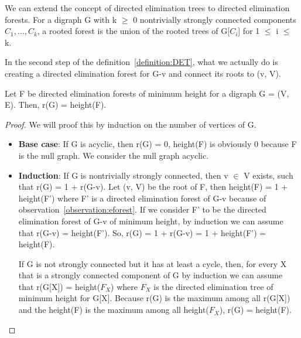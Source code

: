 We can extend the concept of directed elimination trees to directed elimination forests. For a digraph G with k $\geq$ 0 nontrivially strongly connected components $C_1, \ldots, C_k$, a rooted forest is the union of the rooted trees of G[$C_i$] for 1 $\leq$ i $\leq$ k.

\begin{observation}
In the second step of the definition~\ref{definition:DET}, what we actually do is creating a directed elimination forest for G-v and connect its roots to (v, V).
\label{observation:eforest}
\end{observation}

\begin{lemma}
Let F be directed elimination forests of minimum height for a digraph G = (V, E). Then, r(G) = height(F). 
\end{lemma}
\begin{proof}
We will proof this by induction on the number of vertices of G.
\begin{itemize}
  \item \textbf{Base case}: If G is acyclic, then r(G) = 0, height(F) is obviously 0 because F is the null graph. We consider the null graph acyclic.
  \item \textbf{Induction}: If G is nontrivially strongly connected, then v $\in$ V exists, such that r(G) = 1 + r(G-v). Let (v, V) be the root of F, then height(F) = 1 + height(F') where F' is a directed elimination forest of G-v because of observation~\ref{observation:eforest}. If we consider F' to be the directed elimination forest of G-v of minimum height, by induction we can assume that r(G-v) = height(F'). So, r(G) = 1 + r(G-v) = 1 + height(F') = height(F).
  
  If G is not strongly connected but it has at least a cycle, then, for every X that is a strongly connected component of G by induction we can assume that r(G[X]) = height($F_X$) where $F_X$ is the directed elimination tree of minimum height for G[X]. Because r(G) is the maximum among all r(G[X]) and the height(F) is the maximum among all height($F_X$), r(G) = height(F).
\end{itemize}
\end{proof}